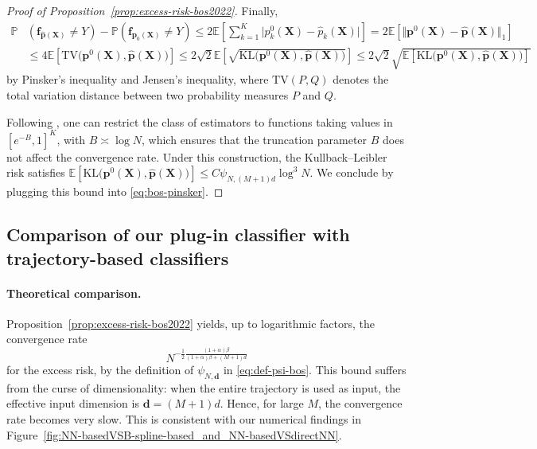 \documentclass{article}
\theoremstyle{plain}
\theoremstyle{definition}
\theoremstyle{remark}
\newcommand{\PP}{\mathbb{P}}
\newcommand{\EE}{\mathbb{E}}
\begin{document}
\begin{proof}[Proof of Proposition~\ref{prop:excess-risk-bos2022}]
Finally, 
\begin{align}
    \PP &(\mathbf{f}_{\widehat{\mathbf{p}}(\mathbf{X})}\neq Y)-\PP (\mathbf{f}_{\mathbf{p}_0(\mathbf{X})}\neq Y)\leq 2\EE \left[\sum_{k=1}^{K}\big|p^0_{k}(\mathbf{X})- \widehat{p}_{k}(\mathbf{X}) \big|\right]= 2 \EE \left[\big\Vert\mathbf{p}^0(\mathbf{X})- \widehat{\mathbf{p}}(\mathbf{X}) \big\Vert_{1}\right]\nonumber\\
    &\leq 4 \EE \left[\mathrm{TV}\big(\mathbf{p}^0(\mathbf{X}), \widehat{\mathbf{p}}(\mathbf{X}) \big)\right]\leq 2\sqrt{2} \EE \left[\sqrt{\mathrm{KL}\big(\mathbf{p}^0(\mathbf{X}), \widehat{\mathbf{p}}(\mathbf{X})\big )}\right]\leq 2\sqrt{2} \sqrt{\EE \left[\mathrm{KL}\big(\mathbf{p}^0(\mathbf{X}), \widehat{\mathbf{p}}(\mathbf{X}) \big)\right]}\label{eq:bos-pinsker}
\end{align}
by Pinsker's inequality and Jensen's inequality, where $\mathrm{TV}(P,Q)$ denotes the total variation distance between two  probability  measures $P$ and $Q$. 

Following \citet[Theorem~3.3 and the discussion thereafter]{bos2022}, one can restrict the class of estimators to functions taking values in $[e^{-B},1]^K$, with $B\asymp \log N$, which ensures that the truncation parameter $B$ does not affect the convergence rate. Under this construction, the Kullback--Leibler risk satisfies
$\EE \left[\mathrm{KL}\big(\mathbf{p}^0(\mathbf{X}), \widehat{\mathbf{p}}(\mathbf{X}) \big)\right]\leq C\psi_{N,(M+1)d}\log^3 N$. We conclude by plugging this bound into \eqref{eq:bos-pinsker}.
\end{proof}

\subsection{Comparison of our plug-in classifier with trajectory-based classifiers}\label{sec:bos-comparison}

\paragraph{Theoretical comparison.}
Proposition~\ref{prop:excess-risk-bos2022} yields, up to logarithmic factors, the convergence rate
\[
N^{-\frac{1}{2}\frac{(1+\alpha)\beta}{(1+\alpha)\beta+(M+1)d}}
\]
for the excess risk, by the definition of \(\psi_{N,\mathbf d}\) in \eqref{eq:def-psi-bos}. 
This bound suffers from the curse of dimensionality: when the entire trajectory is used as input, the effective input dimension is \(\mathbf d=(M+1)d\). Hence, for large \(M\), the convergence rate becomes very slow. This is consistent with our numerical findings in Figure~\ref{fig:NN-basedVSB-spline-based_and_NN-basedVSdirectNN}. 
\end{document}
